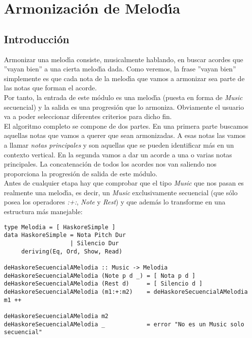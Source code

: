 \chapter{Armonizaci\'on de Melod\'\i a}

\section{Introducci\'on}
Armonizar una melod\'\i a consiste, musicalmente hablando, en buscar
acordes que ''vayan bien'' a una cierta melod\'\i a dada. Como
veremos, la frase ''vayan bien'' simplemente es que cada nota
de la melod\'\i a que vamos a armonizar sea parte de las notas que forman el
acorde.\\
Por tanto, la entrada de este m\'odulo es una melod\'\i a (puesta en forma
de \emph{Music} secuencial) y la salida es una progresi\'on que lo armoniza.
Obviamente el usuario va a poder seleccionar diferentes criterios para
dicho fin.\\
\indent El algoritmo completo se compone de dos partes. En una primera parte
buscamos aquellas notas que vamos a querer que sean armonizadas. A esas
notas las vamos a llamar \emph{notas principales} y son aquellas que se pueden identificar
m\'as en un contexto vertical. En la segunda 
vamos a dar un acorde a una o varias notas principales. La concatenaci\'on
de todos los acordes nos van saliendo nos proporciona la progresi\'on de salida de este m\'odulo.\\
\indent Antes de cualquier etapa hay que comprobar que el tipo \emph{Music} que nos
pasan es realmente una melod\'\i a, es decir, un \emph{Music} exclusivamente 
secuencial (que s\'olo posea los operadores \emph{:+:}, \emph{Note} y \emph{Rest}) y que adem\'as
lo transforme en una estructura m\'as manejable:
\small
\begin{verbatim}
type Melodia = [ HaskoreSimple ]
data HaskoreSimple = Nota Pitch Dur
                   | Silencio Dur
     deriving(Eq, Ord, Show, Read)

deHaskoreSecuencialAMelodia :: Music -> Melodia
deHaskoreSecuencialAMelodia (Note p d _) = [ Nota p d ]
deHaskoreSecuencialAMelodia (Rest d)     = [ Silencio d ]
deHaskoreSecuencialAMelodia (m1:+:m2)    = deHaskoreSecuencialAMelodia m1 ++ 
                                                deHaskoreSecuencialAMelodia m2
deHaskoreSecuencialAMelodia _            = error "No es un Music solo secuencial"
\end{verbatim}
\normalsize

